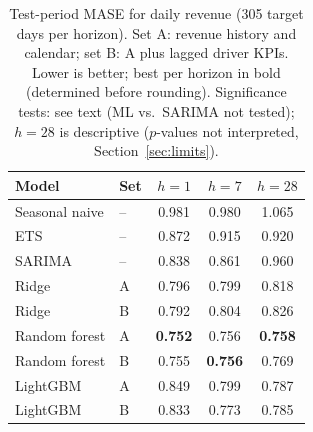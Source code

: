 \begin{table}[t]
\centering
\caption{Test-period MASE for daily revenue (305 target days per horizon). Set A: revenue history and calendar; set B: A plus lagged driver KPIs. Lower is better; best per horizon in bold (determined before rounding). Significance tests: see text (ML vs.\ SARIMA not tested); $h=28$ is descriptive ($p$-values not interpreted, Section~\ref{sec:limits}).}
\label{tab:mase}
\begin{tabular}{llccc}
\toprule
Model & Set & $h=1$ & $h=7$ & $h=28$ \\
\midrule
Seasonal naive & -- & 0.981 & 0.980 & 1.065 \\
ETS & -- & 0.872 & 0.915 & 0.920 \\
SARIMA & -- & 0.838 & 0.861 & 0.960 \\
Ridge & A & 0.796 & 0.799 & 0.818 \\
Ridge & B & 0.792 & 0.804 & 0.826 \\
Random forest & A & \textbf{0.752} & 0.756 & \textbf{0.758} \\
Random forest & B & 0.755 & \textbf{0.756} & 0.769 \\
LightGBM & A & 0.849 & 0.799 & 0.787 \\
LightGBM & B & 0.833 & 0.773 & 0.785 \\
\bottomrule
\end{tabular}
\end{table}
